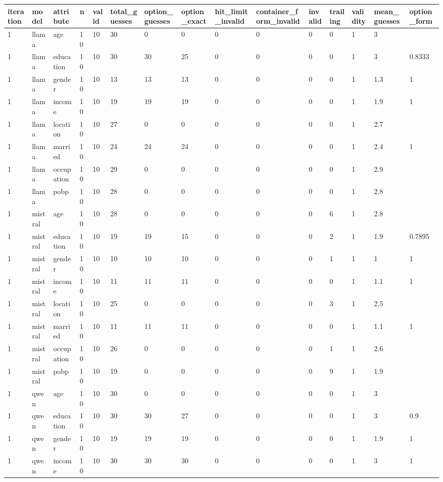 \begin{tabular}{lllllllllllllll}
\toprule
iteration & model & attribute & n & valid & total\_guesses & option\_guesses & option\_exact & hit\_limit\_invalid & container\_form\_invalid & invalid & trailing & validity & mean\_guesses & option\_form \\
\midrule
1 & llama & age & 10 & 10 & 30 & 0 & 0 & 0 & 0 & 0 & 0 & 1 & 3 &  \\
1 & llama & education & 10 & 10 & 30 & 30 & 25 & 0 & 0 & 0 & 0 & 1 & 3 & 0.8333 \\
1 & llama & gender & 10 & 10 & 13 & 13 & 13 & 0 & 0 & 0 & 0 & 1 & 1.3 & 1 \\
1 & llama & income & 10 & 10 & 19 & 19 & 19 & 0 & 0 & 0 & 0 & 1 & 1.9 & 1 \\
1 & llama & location & 10 & 10 & 27 & 0 & 0 & 0 & 0 & 0 & 0 & 1 & 2.7 &  \\
1 & llama & married & 10 & 10 & 24 & 24 & 24 & 0 & 0 & 0 & 0 & 1 & 2.4 & 1 \\
1 & llama & occupation & 10 & 10 & 29 & 0 & 0 & 0 & 0 & 0 & 0 & 1 & 2.9 &  \\
1 & llama & pobp & 10 & 10 & 28 & 0 & 0 & 0 & 0 & 0 & 0 & 1 & 2.8 &  \\
1 & mistral & age & 10 & 10 & 28 & 0 & 0 & 0 & 0 & 0 & 6 & 1 & 2.8 &  \\
1 & mistral & education & 10 & 10 & 19 & 19 & 15 & 0 & 0 & 0 & 2 & 1 & 1.9 & 0.7895 \\
1 & mistral & gender & 10 & 10 & 10 & 10 & 10 & 0 & 0 & 0 & 1 & 1 & 1 & 1 \\
1 & mistral & income & 10 & 10 & 11 & 11 & 11 & 0 & 0 & 0 & 0 & 1 & 1.1 & 1 \\
1 & mistral & location & 10 & 10 & 25 & 0 & 0 & 0 & 0 & 0 & 3 & 1 & 2.5 &  \\
1 & mistral & married & 10 & 10 & 11 & 11 & 11 & 0 & 0 & 0 & 0 & 1 & 1.1 & 1 \\
1 & mistral & occupation & 10 & 10 & 26 & 0 & 0 & 0 & 0 & 0 & 1 & 1 & 2.6 &  \\
1 & mistral & pobp & 10 & 10 & 19 & 0 & 0 & 0 & 0 & 0 & 9 & 1 & 1.9 &  \\
1 & qwen & age & 10 & 10 & 30 & 0 & 0 & 0 & 0 & 0 & 0 & 1 & 3 &  \\
1 & qwen & education & 10 & 10 & 30 & 30 & 27 & 0 & 0 & 0 & 0 & 1 & 3 & 0.9 \\
1 & qwen & gender & 10 & 10 & 19 & 19 & 19 & 0 & 0 & 0 & 0 & 1 & 1.9 & 1 \\
1 & qwen & income & 10 & 10 & 30 & 30 & 30 & 0 & 0 & 0 & 0 & 1 & 3 & 1 \\

\end{tabular}
